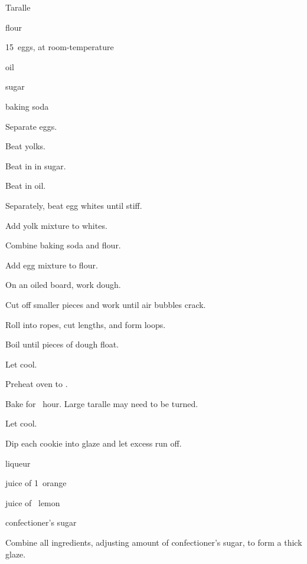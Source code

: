 \begin{recipe}{Taralle}{}{}

\begin{ingredients}
\item {} flour
\item 15~eggs, at room-temperature
\item \C{\half} oil
\item {} sugar
\item \tp{\eighth} baking soda
\end{ingredients}

\begin{directions}
\item Separate eggs.
\item Beat yolks.
\item Beat in in sugar.
\item Beat in oil.
\item Separately, beat egg whites until stiff.
\item Add yolk mixture to whites.
\item Combine baking soda and flour.
\item Add egg mixture to flour.
\item On an oiled board, work dough.
\item Cut off smaller pieces and work until air bubbles crack.
\item Roll into ropes, cut lengths, and form loops.
\item Boil until pieces of dough float.
\item Let cool.
\item Preheat oven to .
\item Bake for \half~hour. Large taralle may need to be turned.
\item Let cool.
\item Dip each cookie into glaze and let excess run off.
\end{directions}

\begin{ingredients}
\item {} liqueur
\item juice of 1~orange
\item juice of \quarter~lemon
\item \lbs{1\half} confectioner's sugar
\end{ingredients}

\begin{directions}
\item Combine all ingredients, adjusting amount of confectioner's sugar, to form a thick glaze.
\end{directions}
\end{recipe}
